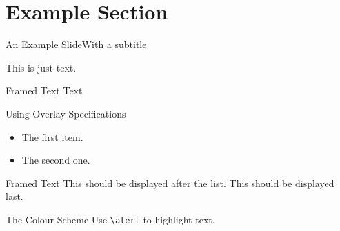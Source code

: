 \section{Example Section}
\begin{frame}[t]{An Example Slide}{With a subtitle}

This is just text.\hfill

\begin{block}{Framed Text}
Text \insertsectionhead
\end{block}
\end{frame}
\begin{frame}{Using Overlay Specifications}
\begin{itemize}[<+(1)->]
\item The first item.
\item The second one.
\end{itemize}
\pause
\begin{block}{Framed Text}
This should be displayed after the list.
\pause
This should be displayed last.
\end{block}
\end{frame}
\begin{frame}{The Colour Scheme}
Use \texttt{\textbackslash alert} to highlight \alert{text}.
\end{frame}